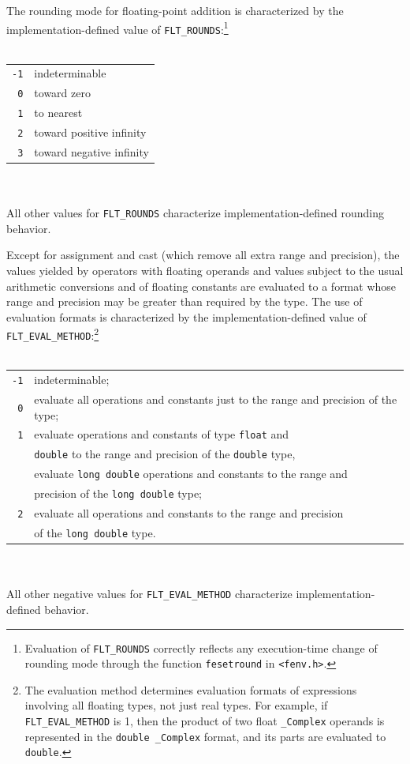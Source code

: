 The rounding mode for floating-point addition is characterized by the
implementation-defined value of \texttt{FLT\_ROUNDS}:\footnote{Evaluation of
  \texttt{FLT\_ROUNDS} correctly reflects any execution-time change of rounding
  mode through the function \texttt{fesetround} in \texttt{<fenv.h>}.}
\\\\
\hspace*{1cm}\begin{tabular}{rl}
\texttt{-1} & indeterminable\\
\texttt{0} & toward zero\\
\texttt{1} & to nearest\\
\texttt{2} & toward positive infinity\\
\texttt{3} & toward negative infinity\\
\end{tabular}
\\\\
All other values for \texttt{FLT\_ROUNDS} characterize implementation-defined
rounding behavior.

Except for assignment and cast (which remove all extra range and precision),
the values yielded by operators with floating operands and values subject to
the usual arithmetic conversions and of floating constants are evaluated to a
format whose range and precision may be greater than required by the type. The
use of evaluation formats is characterized by the implementation-defined value
of \texttt{FLT\_EVAL\_METHOD}:\footnote{The evaluation method determines
  evaluation formats of expressions involving all floating types, not just real
  types. For example, if \texttt{FLT\_EVAL\_METHOD} is 1, then the product of
  two float \texttt{\_Complex} operands is represented in the \texttt{double
    \_Complex} format, and its parts are evaluated to \texttt{double}.}
\\\\
\hspace*{1cm}\begin{tabular}{rl}
\texttt{-1} & indeterminable;\\
\texttt{0} & evaluate all operations and constants just to the range and
precision of the type;\\
\texttt{1} & evaluate operations and constants of type \texttt{float} and\\
&\texttt{double} to the range and precision of the \texttt{double} type,\\
&evaluate \texttt{long double} operations and constants to the range and\\
&precision of the \texttt{long double} type;\\
\texttt{2} & evaluate all operations and constants to the range and precision\\
&of the \texttt{long double} type.
\end{tabular}
\\\\
All other negative values for \texttt{FLT\_EVAL\_METHOD} characterize
implementation-defined behavior.

